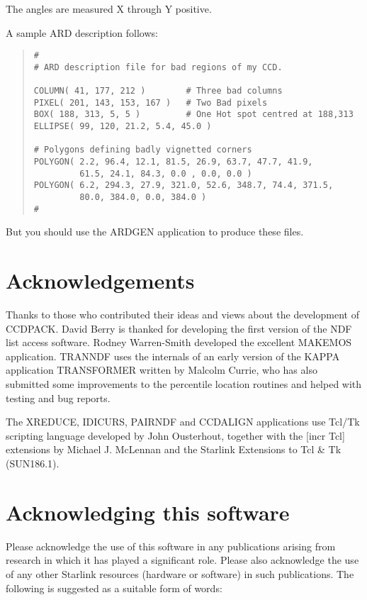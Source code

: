 \documentclass[twoside,11pt]{article}
\newcommand{\htmladdnormallink}[2]{#1}
\newcommand{\htmlref}[2]{#1}
\newcommand{\xref}[3]{#1}
\renewcommand{\_}{\texttt{\symbol{95}}}
\newenvironment{myquote}{\begin{quote}\begin{small}}{\end{small}\end{quote}}
\newcommand{\xroutine}[1]{\htmlref{{\sc #1}}{#1}}
\begin{document}
The angles are measured X through Y positive.

A sample ARD description follows:
\begin{myquote}
\begin{verbatim}
#
# ARD description file for bad regions of my CCD.

COLUMN( 41, 177, 212 )        # Three bad columns
PIXEL( 201, 143, 153, 167 )   # Two Bad pixels
BOX( 188, 313, 5, 5 )         # One Hot spot centred at 188,313
ELLIPSE( 99, 120, 21.2, 5.4, 45.0 )

# Polygons defining badly vignetted corners
POLYGON( 2.2, 96.4, 12.1, 81.5, 26.9, 63.7, 47.7, 41.9,
         61.5, 24.1, 84.3, 0.0 , 0.0, 0.0 )
POLYGON( 6.2, 294.3, 27.9, 321.0, 52.6, 348.7, 74.4, 371.5,
         80.0, 384.0, 0.0, 384.0 )
#
\end{verbatim}
\end{myquote}

But you should use the \xref{ARDGEN}{sun95}{ARDGEN} application to
produce these files.

\section{Acknowledgements}

Thanks to those who contributed their ideas and views about the
development of CCDPACK. David Berry is thanked for developing the
first version of the NDF list access software. Rodney Warren-Smith
developed the excellent \xroutine{MAKEMOS}
application. \xroutine{TRANNDF} uses the internals of an early version
of the KAPPA application \xref{TRANSFORMER}{sun95}{TRANSFORMER}
written by Malcolm Currie, who has also submitted some improvements
to the percentile location routines and helped with testing and bug reports.

The \xroutine{XREDUCE}, \xroutine{IDICURS}, \xroutine{PAIRNDF} and
\xroutine{CCDALIGN}  applications use
\htmladdnormallink{Tcl/Tk}{http://www.scriptics.com/}
scripting language developed by John Ousterhout, together with the
\htmladdnormallink{[incr Tcl]}{http://www.tcltk.com/itcl} extensions
by Michael J. McLennan and the
\xref{Starlink Extensions to Tcl \& Tk}{sun186}{} (SUN186.1).

\section{Acknowledging this software}
Please acknowledge the use of this software in any publications arising
from research in which it has played a significant role. Please also
acknowledge the use of any other Starlink resources (hardware or
software) in such publications. The following is suggested as a suitable
form of words:
\end{document}
